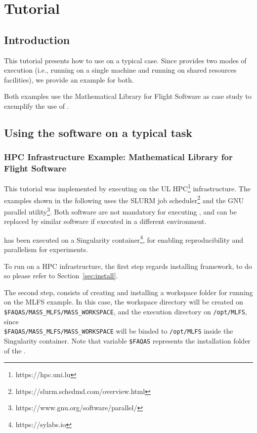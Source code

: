 
\chapter{Tutorial}

\section{Introduction}

This tutorial presents how to use \MASS on a typical case. Since \MASS provides two modes of execution (i.e., running \MASS on a single machine and running \MASS on shared resources facilities), we provide an example for both.

Both examples use the Mathematical Library for Flight Software as case study to exemplify the use of \FAQAS.

\section{Using the software on a typical task}







\subsection{HPC Infrastructure Example: Mathematical Library for Flight Software}

This tutorial was implemented by executing \MASS on the UL HPC\footnote{https://hpc.uni.lu} infrastructure.
The examples shown in the following uses the SLURM job scheduler\footnote{https://slurm.schedmd.com/overview.html} and the GNU parallel utility\footnote{https://www.gnu.org/software/parallel/}. Both software are not mandatory for executing \MASS, and can be replaced by similar software if executed in a different environment.

\MASS has been executed on a Singularity container\footnote{https://sylabs.io}, for enabling reproducibility and parallelism for experiments.

To run \MASS on a HPC infrastructure, the first step regards installing \MASS framework, to do so please refer to Section~\ref{sec:install}.

The second step, consists of creating and installing a workspace folder for running \MASS on the MLFS example. In this case, the workspace directory will be created on \\\texttt{\$FAQAS/MASS\_MLFS/MASS\_WORKSPACE}, and the execution directory on \texttt{/opt/MLFS}, since \\\texttt{\$FAQAS/MASS\_MLFS/MASS\_WORKSPACE} will be binded to \texttt{/opt/MLFS} inside the Singularity container.
Note that variable \texttt{\$FAQAS} represents the installation folder of the \FAQAS.

